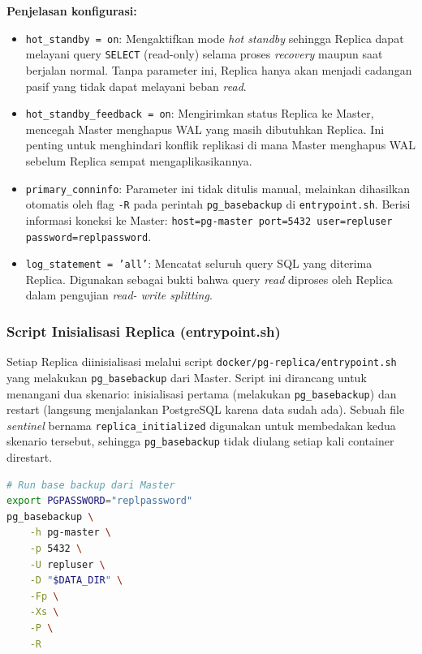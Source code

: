 \textbf{Penjelasan konfigurasi:}
\begin{itemize}
    \item \texttt{hot\_standby = on}: Mengaktifkan mode
    \textit{hot standby} sehingga Replica dapat melayani query
    \texttt{SELECT} (read-only) selama proses \textit{recovery}
    maupun saat berjalan normal. Tanpa parameter ini, Replica hanya
    akan menjadi cadangan pasif yang tidak dapat melayani beban
    \textit{read}.
    \item \texttt{hot\_standby\_feedback = on}: Mengirimkan status
    Replica ke Master, mencegah Master menghapus WAL yang masih
    dibutuhkan Replica. Ini penting untuk menghindari konflik replikasi
    di mana Master menghapus WAL sebelum Replica sempat
    mengaplikasikannya.
    \item \texttt{primary\_conninfo}: Parameter ini tidak ditulis
    manual, melainkan dihasilkan otomatis oleh flag \texttt{-R} pada
    perintah \texttt{pg\_basebackup} di \texttt{entrypoint.sh}.
    Berisi informasi koneksi ke Master: \texttt{host=pg-master
    port=5432 user=repluser password=replpassword}.
    \item \texttt{log\_statement = 'all'}: Mencatat seluruh query SQL
    yang diterima Replica. Digunakan sebagai bukti bahwa query
    \textit{read} diproses oleh Replica dalam pengujian \textit{read-
    write splitting}.
\end{itemize}

\subsubsection{Script Inisialisasi Replica (entrypoint.sh)}

Setiap Replica diinisialisasi melalui script
\texttt{docker/pg-replica/entrypoint.sh} yang melakukan
\texttt{pg\_basebackup} dari Master. Script ini dirancang untuk
menangani dua skenario: inisialisasi pertama (melakukan
\texttt{pg\_basebackup}) dan restart (langsung menjalankan PostgreSQL
karena data sudah ada). Sebuah file \textit{sentinel} bernama
\texttt{replica\_initialized} digunakan untuk membedakan kedua
skenario tersebut, sehingga \texttt{pg\_basebackup} tidak diulang
setiap kali container direstart.

\begin{lstlisting}[language=bash, caption={Script Inisialisasi Replica
(docker/pg-replica/entrypoint.sh)}, label={lst:replica-entry}]
# Run base backup dari Master
export PGPASSWORD="replpassword"
pg_basebackup \
    -h pg-master \
    -p 5432 \
    -U repluser \
    -D "$DATA_DIR" \
    -Fp \
    -Xs \
    -P \
    -R
\end{lstlisting}

